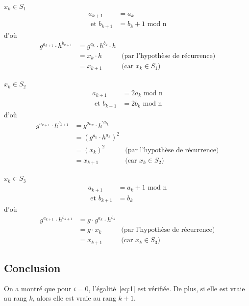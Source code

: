         \underline{$x_{k} \in S_1$}
        \begin{align*}
          a_{k+1} &= a_k \\
          \text{\ et } b_{k+1} &= b_k + 1 \text{\ mod n}
        \end{align*}
        d'où
        \begin{align*}
          g^{a_{k+1}} \cdot h^{b_{k+1}} &= g^{a_k} \cdot h^{b_k} \cdot h \\
                                                 &= x_k \cdot h & \text{(par l'hypothèse de récurrence)} \\
                                                 &= x_{k+1} & \text{(car $x_k \in S_1$)}
        \end{align*}


        \underline{$x_{k} \in S_2$}
        \begin{align*}
          a_{k+1} &= 2a_k \text{\ mod n}\\
          \text{\ et } b_{k+1} &= 2b_k \text{\ mod n}
        \end{align*}
        d'où
        \begin{align*}
          g^{a_{k+1}} \cdot h^{b_{k+1}} &= g^{2a_k} \cdot h^{2b_k} \\
                                                 &= {(g^{a_k} \cdot h^{a_k})}^2 \\
                                                 &= {(x_k)}^2 & \text{(par l'hypothèse de récurrence)} \\
                                                 &= x_{k+1} & \text{(car $x_k \in S_2$)}
        \end{align*}

        \underline{$x_{k} \in S_3$}
        \begin{align*}
          a_{k+1} &= a_k + 1 \text{\ mod n} \\
          \text{\ et } b_{k+1} &= b_k
        \end{align*}
        d'où
        \begin{align*}
          g^{a_{k+1}} \cdot h^{b_{k+1}} &= g \cdot g^{a_k} \cdot h^{b_k} \\
                                                 &= g \cdot x_k & \text{(par l'hypothèse de récurrence)} \\
                                                 &= x_{k+1} & \text{(car $x_k \in S_3$)}
        \end{align*}


        \subsection*{Conclusion}
        On a montré que pour $i = 0$, l'égalité~\ref{eq:1} est vérifiée.
        De plus, si elle est vraie au rang $k$, alors elle est vraie au rang $k+1$.

